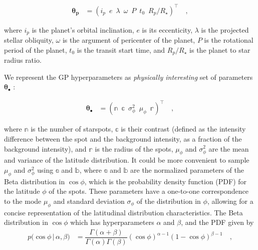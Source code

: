 \documentclass[twocolumn]{aastex631}
\begin{document}
\begin{linenomath}\begin{align}
    \label{eq:thetap}
    \pmb{\theta_p}
     & =
    \left(
    i_p
    \,\,\,
    e
    \,\,\,
    \lambda
    \,\,\,
    \omega
    \,\,\,
    P
    \,\,\,
    t_0
    \,\,\,
    R_p/R_\star
    \right)^\top
    \quad,
\end{align}\end{linenomath}
where $i_p$ is the planet's orbital inclination, $e$ is its eccenticity, $\lambda$ is the projected stellar obliquity, $\omega$ is the argument of pericenter of the planet,
$P$ is the rotational period of the planet, $t_0$ is the transit start time, and $R_p/R_\star$ is the planet to star radius ratio.

We represent the GP hyperparameters as \emph{physically interesting} set of parameters $\pmb{\theta}_\bullet$ \citep{Luger2021b}:
%
\begin{linenomath}\begin{align}
        \label{eq:thetaspot}
        \pmb{\theta}_\bullet
         & =
        \left(
        \mathbb{n}
        \,\,\,
        \mathbb{c}
        \,\,\,
        \sigma^2_\phi
        \,\,\,
        \mu_\phi
        \,\,\,
        \mathbb{r}
        \right)^\top
        \quad,
    \end{align}\end{linenomath}
%
where $\mathbb{n}$ is the number of starspots, $\mathbb{c}$ is their contrast (defined as the intensity difference between the spot and the 
background intensity, as a fraction of the background intensity), and $\mathbb{r}$ is the radius
of the spots, $\mu_\phi$ and $\sigma^2_\phi$ are the mean and variance of the latitude distribution. 
It could be more convenient to sample $\mu_\phi$ and $\sigma^2_\phi$ using $\mathbb{a}$ and $\mathbb{b}$, where
$\mathbb{a}$ and $\mathbb{b}$ are the normalized parameters of the Beta distribution in $\cos\phi$, which is the probability density function (PDF) 
for the latitude $\phi$ of the spots. These parameters have a one-to-one correspondence to the mode $\mu_\phi$ and standard deviation $\sigma_\phi$ of the 
distribution in $\phi$, allowing for a concise representation of the latitudinal distribution characteristics.
The Beta distribution in $\cos\phi$ which has hyperparameters $\alpha$ and $\beta$, and the PDF given by
%
\begin{align}
    \label{eq:cosphi-pdf}
    p \big(\cos\phi \, \big| \, \alpha, \beta \big)
     & =
    \dfrac{\Gamma(\alpha + \beta)}{\Gamma(\alpha)\Gamma(\beta)}
    (\cos\phi)^{\alpha - 1}
    (1 - \cos\phi)^{\beta - 1}
    \quad,
\end{align}
\end{document}
